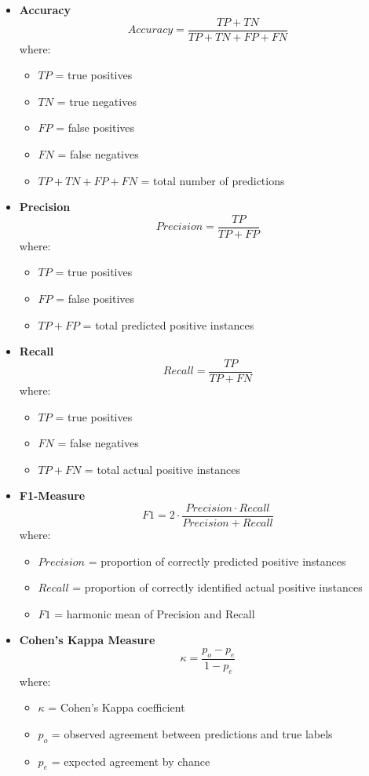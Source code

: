 \begin{itemize}

    \item \textbf{Accuracy}
    \[
    Accuracy = \frac{TP + TN}{TP + TN + FP + FN}
    \]
    where:
    \begin{itemize}
        \item $TP$ = true positives
        \item $TN$ = true negatives
        \item $FP$ = false positives
        \item $FN$ = false negatives
        \item $TP + TN + FP + FN$ = total number of predictions
    \end{itemize}

    \item \textbf{Precision}
    \[
    Precision = \frac{TP}{TP + FP}
    \]
    where:
    \begin{itemize}
        \item $TP$ = true positives
        \item $FP$ = false positives
        \item $TP + FP$ = total predicted positive instances
    \end{itemize}

    \item \textbf{Recall}
    \[
    Recall = \frac{TP}{TP + FN}
    \]
    where:
    \begin{itemize}
        \item $TP$ = true positives
        \item $FN$ = false negatives
        \item $TP + FN$ = total actual positive instances
    \end{itemize}

    \item \textbf{F1-Measure}
    \[
    F1 = 2 \cdot \frac{Precision \cdot Recall}{Precision + Recall}
    \]
    where:
    \begin{itemize}
        \item $Precision$ = proportion of correctly predicted positive instances
        \item $Recall$ = proportion of correctly identified actual positive instances
        \item $F1$ = harmonic mean of Precision and Recall
    \end{itemize}

    \item \textbf{Cohen's Kappa Measure}
    \[
    \kappa = \frac{p_o - p_e}{1 - p_e}
    \]
    where:
    \begin{itemize}
        \item $\kappa$ = Cohen's Kappa coefficient
        \item $p_o$ = observed agreement between predictions and true labels
        \item $p_e$ = expected agreement by chance
    \end{itemize}


\end{itemize}
